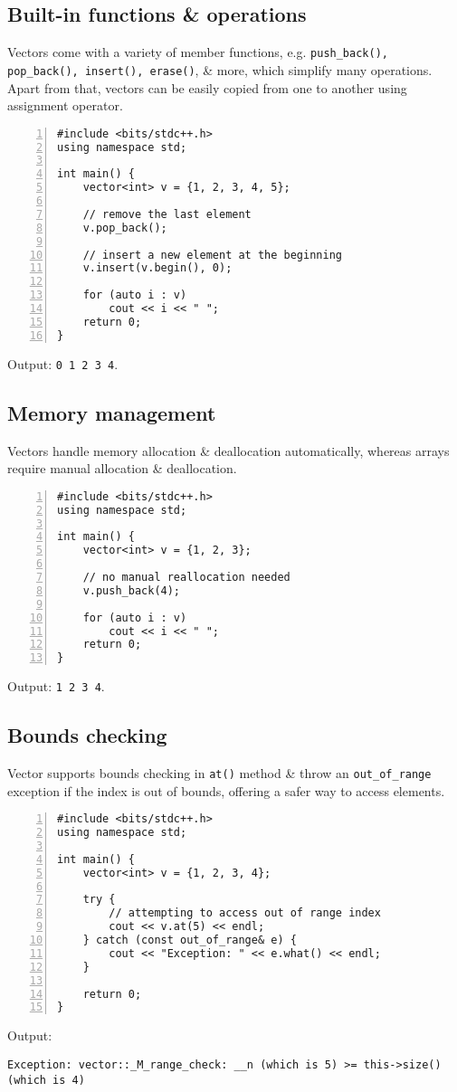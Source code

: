 \documentclass{article}
\begin{document}
\subsection{Built-in functions \& operations}
Vectors come with a variety of member functions, e.g. \verb|push_back(), pop_back(), insert(), erase()|, \& more, which simplify many operations. Apart from that, vectors can be easily copied from one to another using assignment operator.
\begin{Verbatim}[numbers=left,xleftmargin=5mm]
#include <bits/stdc++.h>
using namespace std;

int main() {
    vector<int> v = {1, 2, 3, 4, 5};
	
    // remove the last element
    v.pop_back();
	
    // insert a new element at the beginning
    v.insert(v.begin(), 0);
	
    for (auto i : v)
        cout << i << " ";
    return 0;
}
\end{Verbatim}
Output: {\tt0 1 2 3 4}.


\subsection{Memory management}
Vectors handle memory allocation \& deallocation automatically, whereas arrays require manual allocation \& deallocation.
\begin{Verbatim}[numbers=left,xleftmargin=5mm]
#include <bits/stdc++.h>
using namespace std;

int main() {
    vector<int> v = {1, 2, 3};
	
    // no manual reallocation needed
    v.push_back(4);
	
    for (auto i : v)
        cout << i << " ";
    return 0;
}
\end{Verbatim}
Output: {\tt1 2 3 4}.


\subsection{Bounds checking}
Vector supports bounds checking in {\tt at()} method \& throw an \verb|out_of_range| exception if the index is out of bounds, offering a safer way to access elements.
\begin{Verbatim}[numbers=left,xleftmargin=5mm]
#include <bits/stdc++.h>
using namespace std;

int main() {
    vector<int> v = {1, 2, 3, 4};
	
    try {
        // attempting to access out of range index
        cout << v.at(5) << endl;	
    } catch (const out_of_range& e) {
        cout << "Exception: " << e.what() << endl;
    }
	
    return 0;
}
\end{Verbatim}
Output:
\begin{verbatim}
Exception: vector::_M_range_check: __n (which is 5) >= this->size() (which is 4)
\end{verbatim}
\end{document}
